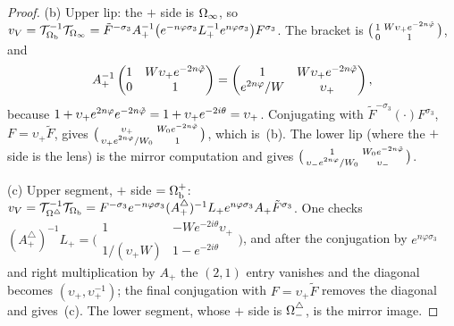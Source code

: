 \begin{proof}
(b) Upper lip: the $+$ side is $\Omega_{\infty}$, so $v_V=\mathcal T_{\Omega_{\mathrm{b}}}^{-1}\mathcal T_{\Omega_{\infty}}=\tilde F^{-\sigma_3}A_+^{-1}\bigl(e^{-n\varphi\sigma_3}
L_+^{-1}e^{n\varphi\sigma_3}\bigr)F^{\sigma_3}$. The bracket is $\bigl(\begin{smallmatrix}1&W\upsilon_+e^{-2n\tilde\varphi}\\0&1
\end{smallmatrix}\bigr)$, and
\[
  A_+^{-1}\begin{pmatrix}1&W\upsilon_+e^{-2n\tilde\varphi}\\0&1\end{pmatrix}=
  \begin{pmatrix}1&W\upsilon_+e^{-2n\tilde\varphi}\\e^{2n\varphi}/W&\upsilon_+\end{pmatrix},
\]
because $1+\upsilon_+e^{2n\varphi}e^{-2n\tilde\varphi}=1+\upsilon_+e^{-2i\theta}=\upsilon_+$. Conjugating with
$\tilde F^{-\sigma_3}(\cdot)F^{\sigma_3}$, $F=\upsilon_+\tilde F$, gives
$\bigl(\begin{smallmatrix}\upsilon_+&W_0e^{-2n\tilde\varphi}\\\upsilon_+e^{2n\varphi}/W_0&1\end{smallmatrix}\bigr)$, which
is~(b). The lower lip (where the $+$ side is the lens) is the mirror computation and gives
$\bigl(\begin{smallmatrix}1&W_0e^{-2n\tilde\varphi}\\\upsilon_-e^{2n\varphi}/W_0&\upsilon_-\end{smallmatrix}\bigr)$.

(c) Upper segment, $+$ side $=\Omega_{\mathrm{b}}^+$: $v_V=\mathcal T_{\Omega^{\triangle}}^{-1}\mathcal T_{\Omega_{\mathrm{b}}}=F^{-\sigma_3}e^{-n\varphi\sigma_3}(A^\triangle_+)^{-1}L_+
e^{n\varphi\sigma_3}A_+\tilde F^{\sigma_3}$. One checks $(A^\triangle_+)^{-1}L_+=\bigl(\begin{smallmatrix}1&-We^{-2i\theta}
\upsilon_+\\1/(\upsilon_+W)&1-e^{-2i\theta}\end{smallmatrix}\bigr)$, and after the conjugation by $e^{n\varphi\sigma_3}$
and right multiplication by $A_+$ the $(2,1)$ entry vanishes and the diagonal becomes $(\upsilon_+,\upsilon_+^{-1})$; the
final conjugation with $F=\upsilon_+\tilde F$ removes the diagonal and gives~(c). The lower segment, whose $+$ side is
$\Omega^{\triangle}_-$, is the mirror image.


\end{proof}
